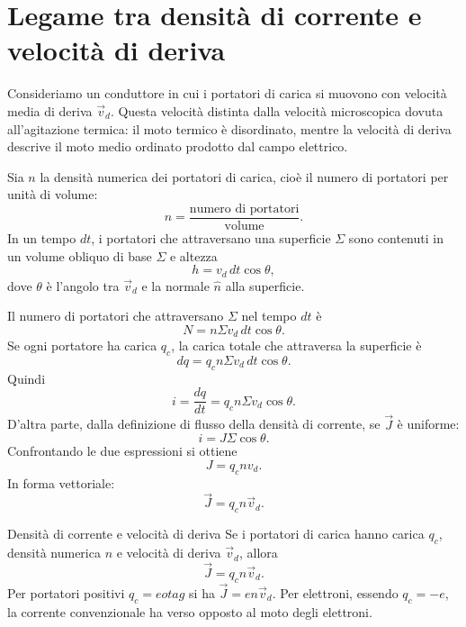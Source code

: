 \documentclass[a4paper]{article}
\begin{document}
\section{Legame tra densità di corrente e velocità di deriva}

Consideriamo un conduttore in cui i portatori di carica si muovono con velocità media di deriva \(\vec{v}_d\). Questa velocità  distinta dalla velocità microscopica dovuta all'agitazione termica: il moto termico è disordinato, mentre la velocità di deriva descrive il moto medio ordinato prodotto dal campo elettrico.

Sia \(n\) la densità numerica dei portatori di carica, cioè il numero di portatori per unità di volume:
\[
    n=\frac{\text{numero di portatori}}{\text{volume}}.
\]
In un tempo \(dt\), i portatori che attraversano una superficie \(
\Sigma\) sono contenuti in un volume obliquo di base \(\Sigma\) e altezza
\[
    h=v_d\,dt\cos\theta,
\]
dove \(\theta\) è l'angolo tra \(\vec{v}_d\) e la normale \(\hat{n}\) alla superficie.

\begin{center}
\end{center}

Il numero di portatori che attraversano \(\Sigma\) nel tempo \(dt\) è
\[
    N=n\Sigma v_d\,dt\cos\theta.
\]
Se ogni portatore ha carica \(q_c\), la carica totale che attraversa la superficie è
\[
    dq=q_c n\Sigma v_d\,dt\cos\theta.
\]
Quindi
\[
    i=\frac{dq}{dt}=q_c n\Sigma v_d\cos\theta.
\]
D'altra parte, dalla definizione di flusso della densità di corrente, se \(\vec{J}\) è uniforme:
\[
    i=J\Sigma\cos\theta.
\]
Confrontando le due espressioni si ottiene
\[
    J=q_c n v_d.
\]
In forma vettoriale:
\[
    \vec{J}=q_c n\vec{v}_d.
\]

\begin{snippetproposition}{Densità di corrente e velocità di deriva}
    Se i portatori di carica hanno carica \(q_c\), densità numerica \(n\) e velocità di deriva \(\vec{v}_d\), allora
    \[
        \vec{J}=q_c n\vec{v}_d.
    \]
    Per portatori positivi \(q_c=e
    otag\) si ha \(\vec{J}=en\vec{v}_d\). Per elettroni, essendo \(q_c=-e\), la corrente convenzionale ha verso opposto al moto degli elettroni.
\end{snippetproposition}
\end{document}
